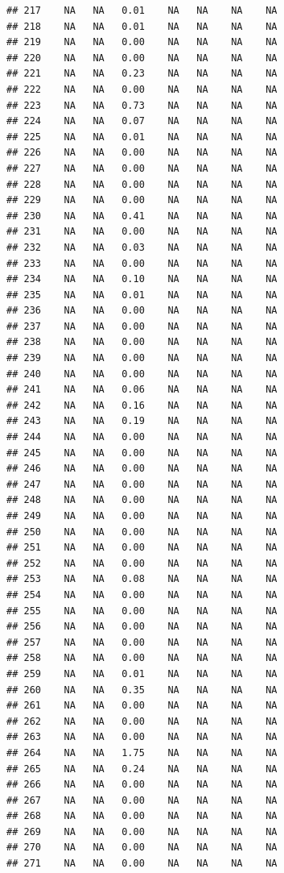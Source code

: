 \documentclass{article}\usepackage{graphicx, color}
\makeatletter
\newenvironment{kframe}{%
 \def\at@end@of@kframe{}%
 \ifinner\ifhmode%
  \def\at@end@of@kframe{\end{minipage}}%
  \begin{minipage}{\columnwidth}%
 \fi\fi%
 \def\FrameCommand##1{\hskip\@totalleftmargin \hskip-\fboxsep
 \colorbox{shadecolor}{##1}\hskip-\fboxsep
     \hskip-\linewidth \hskip-\@totalleftmargin \hskip\columnwidth}%
 \MakeFramed {\advance\hsize-\width
   \@totalleftmargin\z@ \linewidth\hsize
   \@setminipage}}%
 {\par\unskip\endMakeFramed%
 \at@end@of@kframe}
\newenvironment{knitrout}{}{} %
\makeatother
\begin{document}
\begin{knitrout}
\begin{kframe}
\begin{verbatim}
## 217    NA   NA   0.01    NA   NA    NA    NA
## 218    NA   NA   0.01    NA   NA    NA    NA
## 219    NA   NA   0.00    NA   NA    NA    NA
## 220    NA   NA   0.00    NA   NA    NA    NA
## 221    NA   NA   0.23    NA   NA    NA    NA
## 222    NA   NA   0.00    NA   NA    NA    NA
## 223    NA   NA   0.73    NA   NA    NA    NA
## 224    NA   NA   0.07    NA   NA    NA    NA
## 225    NA   NA   0.01    NA   NA    NA    NA
## 226    NA   NA   0.00    NA   NA    NA    NA
## 227    NA   NA   0.00    NA   NA    NA    NA
## 228    NA   NA   0.00    NA   NA    NA    NA
## 229    NA   NA   0.00    NA   NA    NA    NA
## 230    NA   NA   0.41    NA   NA    NA    NA
## 231    NA   NA   0.00    NA   NA    NA    NA
## 232    NA   NA   0.03    NA   NA    NA    NA
## 233    NA   NA   0.00    NA   NA    NA    NA
## 234    NA   NA   0.10    NA   NA    NA    NA
## 235    NA   NA   0.01    NA   NA    NA    NA
## 236    NA   NA   0.00    NA   NA    NA    NA
## 237    NA   NA   0.00    NA   NA    NA    NA
## 238    NA   NA   0.00    NA   NA    NA    NA
## 239    NA   NA   0.00    NA   NA    NA    NA
## 240    NA   NA   0.00    NA   NA    NA    NA
## 241    NA   NA   0.06    NA   NA    NA    NA
## 242    NA   NA   0.16    NA   NA    NA    NA
## 243    NA   NA   0.19    NA   NA    NA    NA
## 244    NA   NA   0.00    NA   NA    NA    NA
## 245    NA   NA   0.00    NA   NA    NA    NA
## 246    NA   NA   0.00    NA   NA    NA    NA
## 247    NA   NA   0.00    NA   NA    NA    NA
## 248    NA   NA   0.00    NA   NA    NA    NA
## 249    NA   NA   0.00    NA   NA    NA    NA
## 250    NA   NA   0.00    NA   NA    NA    NA
## 251    NA   NA   0.00    NA   NA    NA    NA
## 252    NA   NA   0.00    NA   NA    NA    NA
## 253    NA   NA   0.08    NA   NA    NA    NA
## 254    NA   NA   0.00    NA   NA    NA    NA
## 255    NA   NA   0.00    NA   NA    NA    NA
## 256    NA   NA   0.00    NA   NA    NA    NA
## 257    NA   NA   0.00    NA   NA    NA    NA
## 258    NA   NA   0.00    NA   NA    NA    NA
## 259    NA   NA   0.01    NA   NA    NA    NA
## 260    NA   NA   0.35    NA   NA    NA    NA
## 261    NA   NA   0.00    NA   NA    NA    NA
## 262    NA   NA   0.00    NA   NA    NA    NA
## 263    NA   NA   0.00    NA   NA    NA    NA
## 264    NA   NA   1.75    NA   NA    NA    NA
## 265    NA   NA   0.24    NA   NA    NA    NA
## 266    NA   NA   0.00    NA   NA    NA    NA
## 267    NA   NA   0.00    NA   NA    NA    NA
## 268    NA   NA   0.00    NA   NA    NA    NA
## 269    NA   NA   0.00    NA   NA    NA    NA
## 270    NA   NA   0.00    NA   NA    NA    NA
## 271    NA   NA   0.00    NA   NA    NA    NA

\end{verbatim}
\end{kframe}
\end{knitrout}
\end{document}
